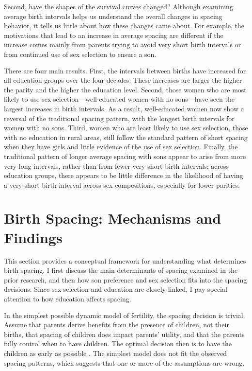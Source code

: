 \documentclass[12pt,letterpaper]{article}
\begin{document}
Second, have the shapes of the survival curves changed?
Although examining average birth intervals helps us understand the overall changes in 
spacing behavior, it tells us little about how these changes came about.
For example, the motivations that lead to an increase in average spacing are different if 
the increase comes mainly from parents trying to avoid very short birth intervals or from 
continued use of sex selection to ensure a son.


There are four main results.
First, the intervals between births have increased for all education groups over the four 
decades.
These increases are larger the higher the parity and the higher the education 
level.
Second, those women who are most likely to use sex selection---well-educated women with no
sons---have seen the largest increases in birth intervals.
As a result, well-educated women now show a reversal of the traditional spacing 
pattern, with the longest birth intervals for women with no sons.
Third, women who are least likely to use sex selection, those with no education in
rural areas, still follow the standard pattern of short spacing when they have girls and 
little evidence of the use of sex selection.
Finally, the traditional pattern of longer average spacing with sons appear to arise from 
more very long intervals, rather than from fewer very short birth intervals; across 
education groups, there appears to be little difference in the likelihood of having a very 
short birth interval across sex compositions, especially for lower parities.



\section{Birth Spacing: Mechanisms and Findings}

This section provides a conceptual framework for understanding what determines  
birth spacing.
I first discuss the main determinants of spacing examined in the prior research, and 
then how son preference and sex selection fits into the spacing decisions.
Since sex selection and education are closely linked, I pay special attention to how 
education affects spacing.

In the simplest possible dynamic model of fertility, the spacing decision is trivial.
Assume that parents derive benefits from the presence of children, not their births, 
that spacing of children does impact parents' utility, 
and that the parents fully control when to have children. 
The optimal decision then is to have the children as early as possible 
\citep{Newman1988}.
The simplest model does not fit the observed spacing patterns, which suggests 
that one or more of the assumptions are wrong.
\end{document}
